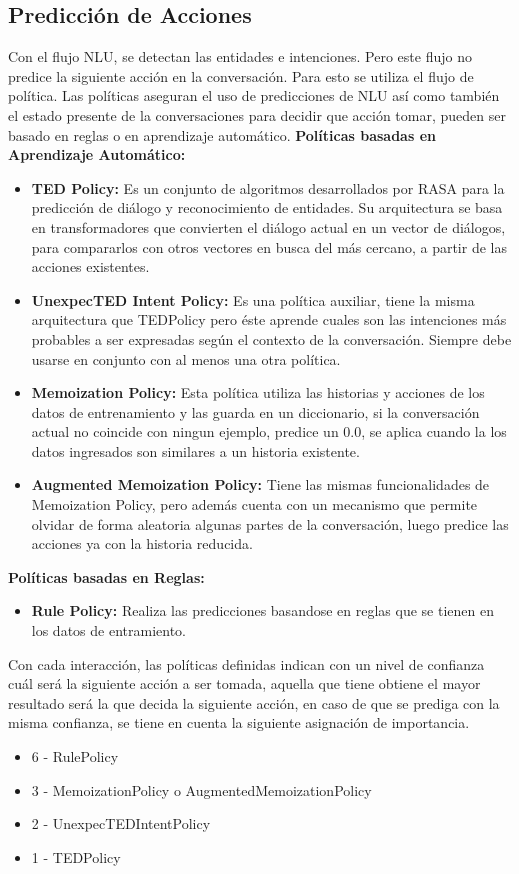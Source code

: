  \subsection{Predicción de Acciones}
Con el flujo NLU, se detectan las entidades e intenciones. Pero este flujo no predice la siguiente acción en la 
conversación. Para esto se utiliza el flujo de política. Las políticas aseguran el uso de predicciones de NLU así como 
también el estado presente de la conversaciones para decidir que acción tomar, pueden ser basado en reglas o en aprendizaje automático.
\textbf{Políticas basadas en Aprendizaje Automático:}
\begin{itemize}
    \item \textbf{TED Policy:}
    Es un conjunto de algoritmos desarrollados por RASA para la predicción de diálogo y reconocimiento de entidades. Su arquitectura se basa en transformadores que convierten el diálogo actual en un vector de diálogos, para compararlos con otros vectores en busca del más cercano, a partir de las acciones existentes.\cite{TED_Policy}
    \item \textbf{UnexpecTED Intent Policy:} Es una política auxiliar, tiene la misma arquitectura que TEDPolicy pero éste aprende cuales son las intenciones más probables a ser expresadas según el contexto de la conversación. Siempre debe usarse en conjunto con al menos una otra política.\cite{UnexpecTED}
    \item \textbf{Memoization Policy: }Esta política utiliza las historias y acciones de los datos de entrenamiento y las guarda en un diccionario, si la conversación actual no coincide con ningun ejemplo, predice un 0.0, se aplica cuando la los datos ingresados son similares a un historia existente.\cite{MemoizationPolicy}
    \item \textbf{Augmented Memoization Policy: } Tiene las mismas funcionalidades de Memoization Policy, pero además cuenta con un mecanismo que permite olvidar de forma aleatoria algunas partes de la conversación, luego predice las acciones ya con la historia reducida.\cite{AugmentedMemoizationPolicy}
\end{itemize}
\textbf{Políticas basadas en Reglas:}
\begin{itemize}
    \item \textbf{Rule Policy:} Realiza las predicciones basandose en reglas que se tienen en los datos de entramiento.
\end{itemize}
\indent Con cada interacción, las políticas definidas indican con un nivel de confianza cuál será la siguiente acción a ser tomada, aquella que tiene obtiene el mayor resultado será la que decida la siguiente acción, en caso de que se prediga con la misma confianza, se tiene en cuenta la siguiente asignación de importancia.
\begin{itemize}
    \item 6 - RulePolicy
    \item 3 - MemoizationPolicy o AugmentedMemoizationPolicy
    \item 2 -  UnexpecTEDIntentPolicy
    \item 1 - TEDPolicy
\end{itemize}
